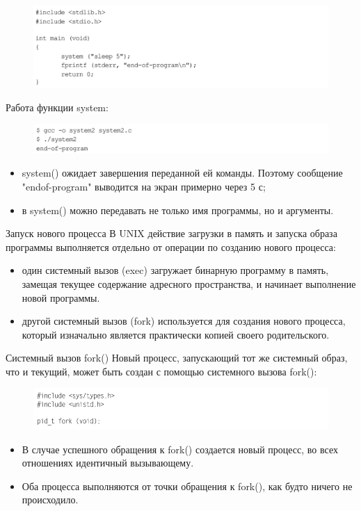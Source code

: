 \documentclass{beamer}
\begin{document}
\begin{frame}
\begin{figure}[h]
\centering
\includegraphics[scale=0.4]{images/lec07-pic20.png}
\end{figure}
Работа функции system:
\begin{figure}[h]
\centering
\includegraphics[scale=0.4]{images/lec07-pic21.png}
\end{figure}
\begin{itemize}
\item system() ожидает завершения переданной ей команды. Поэтому сообщение "endof-program" выводится на экран примерно через 5 с;
\item в system() можно передавать не только имя программы, но и аргументы.
\end{itemize}
\end{frame}

\begin{frame}{Запуск нового процесса}
В UNIX действие загрузки в память и запуска образа программы выполняется
отдельно от операции по созданию нового процесса:
\begin{itemize}
\item один системный вызов (exec) загружает бинарную программу в память, замещая текущее содержание адресного пространства, и начинает выполнение новой программы. 
\item другой системный вызов (fork) используется для создания нового процесса, который изначально является практически копией своего родительского.
\end{itemize}
\end{frame}

\begin{frame}{Системный вызов fork()}
Новый процесс, запускающий тот же системный образ, что и текущий, может быть
создан с помощью системного вызова fork():
\begin{figure}[h]
\centering
\includegraphics[scale=0.5]{images/lec07-pic07.png}
\end{figure}
\begin{itemize}
\item В случае успешного обращения к fork() создается новый процесс, во всех отношениях идентичный вызывающему. 
\item Оба процесса выполняются от точки обращения к fork(), как будто ничего не происходило.
\end{itemize}
\end{frame}
\end{document}
